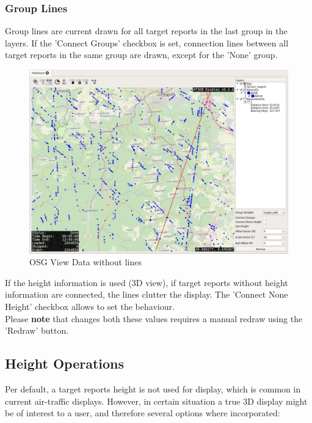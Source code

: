 \subsubsection{Group Lines}

Group lines are current drawn for all target reports in the last group in the layers. If the 'Connect Groups' checkbox is set, connection lines between all target reports in the same group are drawn, except for the 'None' group.

\begin{figure}[H]
    \hspace*{-2cm}
    \includegraphics[width=18cm,frame]{../screenshots/osgview_no_lines.png}
  \caption{OSG View Data without lines}
\end{figure}

If the height information is used (3D view), if target reports without height information are connected, the lines clutter the display. The 'Connect None Height' checkbox allows to set the behaviour. \\

Please \textbf{note} that changes both these values requires a manual redraw using the 'Redraw' button.

\subsection{Height Operations}

Per default, a target reports height is not used for display, which is common in current air-traffic displays. However, in certain situation a true 3D display might be of interest to a user, and therefore several options where incorporated:

